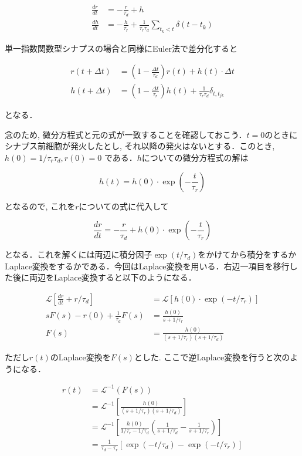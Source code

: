 \begin{align} 
\frac{dr}{dt}&=-\frac{r}{\tau_{d}}+h\\
\frac{dh}{dt}&=-\frac{h}{\tau_{r}}+\frac{1}{\tau_{r} \tau_{d}} \sum_{t_{k}< t} \delta\left(t-t_{k}\right) 
\end{align} 


単一指数関数型シナプスの場合と同様にEuler法で差分化すると 


\begin{align} 
r(t+\Delta t)&=\left(1-\frac{\Delta t}{\tau_{d}}\right)r(t)+h(t)\cdot \Delta t\\ 
h(t+\Delta t)&=\left(1-\frac{\Delta t}{\tau_{r}}\right)h(t)+\frac{1}{\tau_{r}\tau_{d}} \delta_{t,t_{j k}}
\end{align}


となる．

念のため, 微分方程式と元の式が一致することを確認しておこう．$t=0$のときにシナプス前細胞が発火したとし, それ以降の発火はないとする．このとき, $h(0)=1/\tau_{r}\tau_{d}, r(0)=0$ である．$h$についての微分方程式の解は


\begin{equation}
h(t)=h(0)\cdot \exp\left(-\frac{t}{\tau_r}\right)    
\end{equation}


となるので, これを$r$についての式に代入して


\begin{equation}
\frac{dr}{dt}=-\frac{r}{\tau_{d}}+h(0)\cdot \exp\left(-\frac{t}{\tau_r}\right) 
\end{equation}


となる．これを解くには両辺に積分因子$\exp({t}/{\tau_d})$をかけてから積分をするかLaplace変換をするかである．今回はLaplace変換を用いる．右辺一項目を移行した後に両辺をLaplace変換すると以下のようになる．


\begin{align}
\mathcal{L}\left[\frac{dr}{dt}+r/\tau_{d}\right]&=\mathcal{L}\left[h(0)\cdot \exp\left(-t/\tau_r\right)\right]\\
sF(s)-r(0)+\frac{1}{\tau_{d}}F(s)&=\frac{h(0)}{s+1/\tau_r}\\
F(s)&=\frac{h(0)}{(s+1/\tau_r)(s+1/\tau_d)}
\end{align}


ただし$r(t)$のLaplace変換を$F(s)$とした. ここで逆Laplace変換を行うと次のようになる．


\begin{align}
r(t)&=\mathcal{L}^{-1}(F(s))\\
&=\mathcal{L}^{-1}\left[\frac{h(0)}{(s+1/\tau_r)(s+1/\tau_d)}\right]\\
&=\mathcal{L}^{-1}\left[\frac{h(0)}{1/\tau_r-1/\tau_d}\left(\frac{1}{s+1/\tau_d}-\frac{1}{s+1/\tau_r}\right)\right]\\
&=\frac{1}{\tau_d-\tau_r}\left[\exp(-t/\tau_d)-\exp(-t/\tau_r)\right]
\end{align}


